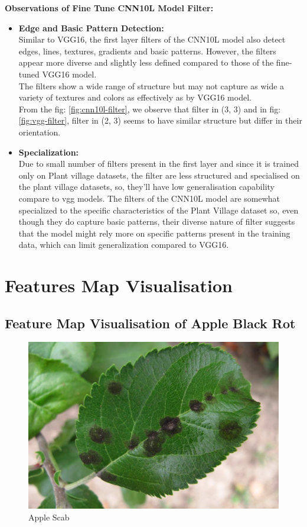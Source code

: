 \textbf{Observations of Fine Tune CNN10L Model Filter: }
\begin{itemize}
    \item \textbf{Edge and Basic Pattern Detection:}\\
    Similar to VGG16, the first layer filters of the CNN10L model also detect edges, lines, textures, gradients and basic patterns. However, the filters appear more diverse and slightly less defined compared to those of the fine-tuned VGG16 model.\\
    The filters show a wide range of structure but may not capture as wide a variety of textures and colors as effectively as by VGG16 model.\\
    From the fig: \ref{fig:cnn10l-filter}, we observe that filter in (3, 3) and in fig: \ref{fig:vgg-filter}, filter in (2, 3) seems to have similar structure but differ in their orientation.\\
    
    \item \textbf{Specialization:}\\
    Due to small number of filters present in the first layer and since it is trained only on Plant village datasets, the filter are less structured and specialised on the plant village datasets, so, they'll have low generalisation capability compare to vgg models.
    The filters of the CNN10L model are somewhat specialized to the specific characteristics of the Plant Village dataset so, even though they do capture basic patterns, their diverse nature of filter suggests that the model might rely more on specific patterns present in the training data, which can limit generalization compared to VGG16.
\end{itemize}

\section{Features Map Visualisation}

\subsection{Feature Map Visualisation of Apple Black Rot}
\begin{figure}
    \centering
    \includegraphics[width=0.5\linewidth]{graphics//chapter7/apple black rot.png}
    \caption{Apple Scab}
    \label{fig:apple-black-rot}
\end{figure}

